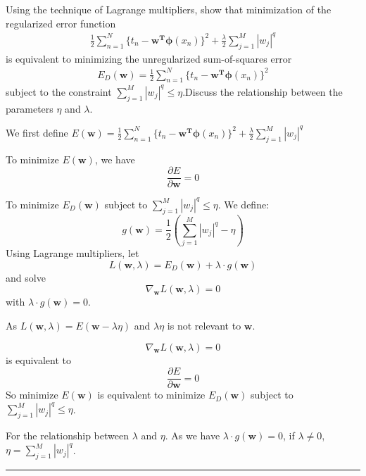 \documentclass[twoside]{article}
\newenvironment{problem}[2][Problem]{\begin{trivlist}
		\item[\hskip \labelsep {\bfseries #1}\hskip \labelsep {\bfseries #2.}]}{\end{trivlist}}
\newenvironment{solution}{{\bf Solution:}}{\hfill\rule{2mm}{2mm}}
\begin{document}
\begin{problem}{2}
	Using the technique of Lagrange multipliers, show that minimization of the regularized error function\\
	\begin{align*}
	\frac{1}{2}\sum_{n=1}^N\{t_n-\bm{w^T\phi}(x_n)\}^2+\frac{\lambda}{2}\sum_{j=1}^M|w_j|^q
	\end{align*}
	is equivalent to minimizing the unregularized sum-of-squares error\\
	\begin{align*}
	E_D(\bm{w})=\frac{1}{2}\sum_{n=1}^N\{t_n-\bm{w^T\phi}(x_n)\}^2
	\end{align*}
	subject to the constraint $\sum_{j=1}^M|w_j|^q\le \eta$.Discuss the relationship between the parameters $\eta$ and $\lambda$.
\end{problem} 
\begin{solution}
	We first define $E(\bm{w})=	\frac{1}{2}\sum_{n=1}^N\{t_n-\bm{w^T\phi}(x_n)\}^2+\frac{\lambda}{2}\sum_{j=1}^M|w_j|^q$
	
	To minimize $E(\bm{w})$, we have
	$$
	\frac{\partial E}{\partial \bm{w}} = 0
	$$
	
	To minimize $E_D(\bm{w})$ subject to $\sum_{j=1}^M|w_j|^q\le \eta$. We define:
	$$
	g(\bm{w}) = \frac{1}{2}(\sum_{j=1}^M|w_j|^q - \eta)
	$$
	Using Lagrange multipliers, let 
	$$L(\bm{w}, \lambda) = E_D(\bm{w})+\lambda \cdot g(\bm{w})$$
	and solve
	$$
	\nabla_{\bm{w}}L(\bm{w}, \lambda) = 0
	$$
	with $\lambda \cdot g(\bm{w}) = 0$.
	
	As $L(\bm{w}, \lambda) = E(\bm{w} - \lambda \eta)$ and $\lambda \eta$ is not relevant to $\bm{w}$.
	
	$$\nabla_{\bm{w}}L(\bm{w}, \lambda) = 0$$ 
	is equivalent to 
	$$\frac{\partial E}{\partial \bm{w}} = 0$$
	So minimize $E(\bm{w})$ is equivalent to minimize $E_D(\bm{w})$ subject to $\sum_{j=1}^M|w_j|^q\le \eta$.
	
	For the relationship between $\lambda$ and $\eta$. As we have $\lambda \cdot g(\bm{w}) = 0$, if $\lambda \ne 0$, $\eta = \sum_{j=1}^M|w_j|^q$.
\end{solution}
\end{document}
